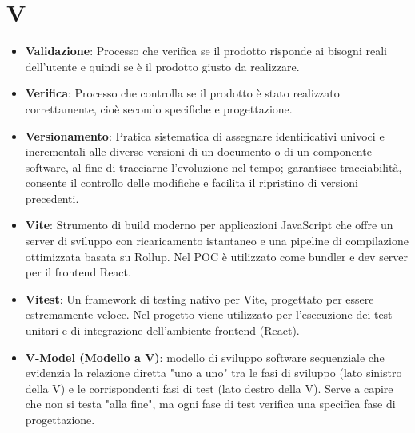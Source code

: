 \documentclass[11pt,a4paper]{article}
\begin{document}
\newpage

\section*{V}
\begin{itemize}
\item \textbf{Validazione}: Processo che verifica se il prodotto risponde ai bisogni reali dell’utente e quindi se è il prodotto giusto da realizzare.

\item \textbf{Verifica}: Processo che controlla se il prodotto è stato realizzato correttamente, cioè secondo specifiche e progettazione.

\item \textbf{Versionamento}: Pratica sistematica di assegnare identificativi univoci e incrementali alle diverse versioni di un documento o di un componente software, al fine di tracciarne l'evoluzione nel tempo; garantisce tracciabilità, consente il controllo delle modifiche e facilita il ripristino di versioni precedenti.

\item \textbf{Vite}: Strumento di build moderno per applicazioni 
JavaScript che offre un server di sviluppo con ricaricamento 
istantaneo e una pipeline di compilazione ottimizzata basata 
su Rollup. Nel POC è utilizzato come bundler e dev server per 
il frontend React.

\item \textbf{Vitest}: Un framework di testing nativo per Vite, progettato per essere estremamente veloce. Nel progetto viene utilizzato per l'esecuzione dei test unitari e di integrazione dell'ambiente frontend (React).

\item \textbf{V-Model (Modello a V)}: modello di sviluppo software sequenziale che evidenzia la relazione diretta "uno a uno" tra le fasi di sviluppo (lato sinistro della V) e le corrispondenti fasi di test (lato destro della V). Serve a capire che non si testa "alla fine", ma ogni fase di test verifica una specifica fase di progettazione.


\end{itemize}

\newpage
\end{document}
